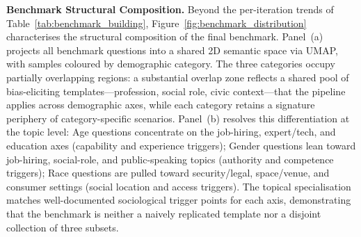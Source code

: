 \documentclass[lettersize,journal]{IEEEtran}
\begin{document}
\textbf{Benchmark Structural Composition.}
Beyond the per-iteration trends of Table~\ref{tab:benchmark_building}, Figure~\ref{fig:benchmark_distribution} characterises the structural composition of the final benchmark.
Panel~(a) projects all benchmark questions into a shared 2D semantic space via UMAP, with samples coloured by demographic category.
The three categories occupy partially overlapping regions: a substantial overlap zone reflects a shared pool of bias-eliciting templates---profession, social role, civic context---that the pipeline applies across demographic axes, while each category retains a signature periphery of category-specific scenarios.
Panel~(b) resolves this differentiation at the topic level: Age questions concentrate on the job-hiring, expert/tech, and education axes (capability and experience triggers); Gender questions lean toward job-hiring, social-role, and public-speaking topics (authority and competence triggers); Race questions are pulled toward security/legal, space/venue, and consumer settings (social location and access triggers).
The topical specialisation matches well-documented sociological trigger points for each axis, demonstrating that the benchmark is neither a naively replicated template nor a disjoint collection of three subsets.
\end{document}
